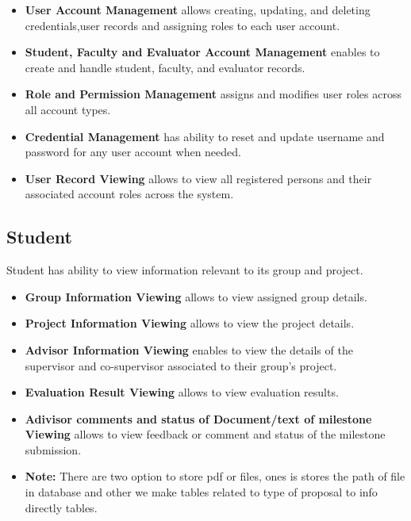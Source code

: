 \documentclass[12pt,a4paper]{report}
\begin{document}
\begin{itemize}
    
    \item \textbf{User Account Management} allows creating, updating, and deleting credentials,user records and assigning roles to each user account.
    
    \item \textbf{Student, Faculty and Evaluator Account Management} enables to create and handle student, faculty, and evaluator records.
    
    \item \textbf{Role and Permission Management} assigns and modifies user roles across all account types.
    
    \item \textbf{Credential Management} has ability to reset and update username and password for any user account when needed.
    
    \item \textbf{User Record Viewing} allows to view all registered persons and their associated account roles across the system.
    
\end{itemize}

\subsection{Student}

Student has ability to view information relevant to its group and project.

\begin{itemize}
    \item \textbf{Group Information Viewing} allows to view assigned group details.
    
    \item \textbf{Project Information Viewing} allows to view the project details.
    
    \item \textbf{Advisor Information Viewing} enables to view the details of the supervisor and co-supervisor associated to their group's project.
    
    \item \textbf{Evaluation Result Viewing} allows to view  evaluation results.
     
    \item \textbf{Adivisor comments and status of Document/text of milestone  Viewing} allows to view  feedback or comment and status of the milestone submission.

  \item \textbf{Note:} There are two option to store pdf or files, ones is stores the path of file in database and other we make tables related to type of proposal to info directly tables.
    
\end{itemize}
\end{document}
